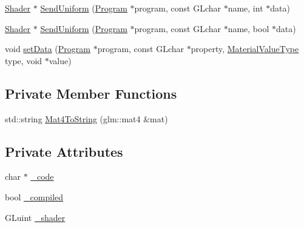 \begin{DoxyCompactItemize}
\item 
\mbox{\hyperlink{classEngine_1_1Components_1_1Graphics_1_1Shader}{Shader}} $\ast$ \mbox{\hyperlink{classEngine_1_1Components_1_1Graphics_1_1Shader_a60af0a0142b5a1ea44923c3f438a179a}{Send\+Uniform}} (\mbox{\hyperlink{classEngine_1_1Components_1_1Graphics_1_1Program}{Program}} $\ast$program, const G\+Lchar $\ast$name, int $\ast$data)
\item 
\mbox{\hyperlink{classEngine_1_1Components_1_1Graphics_1_1Shader}{Shader}} $\ast$ \mbox{\hyperlink{classEngine_1_1Components_1_1Graphics_1_1Shader_a9894564e19539e2d152df99ea9e5bc29}{Send\+Uniform}} (\mbox{\hyperlink{classEngine_1_1Components_1_1Graphics_1_1Program}{Program}} $\ast$program, const G\+Lchar $\ast$name, bool $\ast$data)
\item 
void \mbox{\hyperlink{classEngine_1_1Components_1_1Graphics_1_1Shader_a169ed9f71afd5f59160e35708e51fe7e}{set\+Data}} (\mbox{\hyperlink{classEngine_1_1Components_1_1Graphics_1_1Program}{Program}} $\ast$program, const G\+Lchar $\ast$property, \mbox{\hyperlink{namespaceEngine_1_1Components_1_1Graphics_a44f5a2b57ee82aed849896c8311e403b}{Material\+Value\+Type}} type, void $\ast$value)
\end{DoxyCompactItemize}
\subsection*{Private Member Functions}
\begin{DoxyCompactItemize}
\item 
std\+::string \mbox{\hyperlink{classEngine_1_1Components_1_1Graphics_1_1Shader_a6d0f90b445c605f12eab980827b8d430}{Mat4\+To\+String}} (glm\+::mat4 \&mat)
\end{DoxyCompactItemize}
\subsection*{Private Attributes}
\begin{DoxyCompactItemize}
\item 
char $\ast$ \mbox{\hyperlink{classEngine_1_1Components_1_1Graphics_1_1Shader_a82939e07025096b6b37f1588620863c5}{\+\_\+code}}
\item 
bool \mbox{\hyperlink{classEngine_1_1Components_1_1Graphics_1_1Shader_a675c32a04d4eb33117d6ff2b988e13b5}{\+\_\+compiled}}
\item 
G\+Luint \mbox{\hyperlink{classEngine_1_1Components_1_1Graphics_1_1Shader_a4494d72a65715eb9f02e06a533684872}{\+\_\+shader}}
\end{DoxyCompactItemize}


